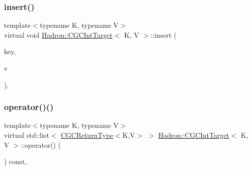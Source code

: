 \mbox{\label{classHadron_1_1CGCIntTarget_a2c1e2eaf068abdc394ba3326c7770e77}} 
\subsubsection{\texorpdfstring{insert()}{insert()}\hspace{0.1cm}{\footnotesize\ttfamily [2/2]}}
{\footnotesize\ttfamily template$<$typename K, typename V$>$ \\
virtual void \mbox{\hyperlink{classHadron_1_1CGCIntTarget}{Hadron\+::\+C\+G\+C\+Int\+Target}}$<$ K, V $>$\+::insert (\begin{DoxyParamCaption}\item[{const \mbox{\hyperlink{structHadron_1_1CGCKeyType}{C\+G\+C\+Key\+Type}}$<$ K $>$ \&}]{key,  }\item[{const V \&}]{v }\end{DoxyParamCaption})\hspace{0.3cm}{\ttfamily [inline]}, {\ttfamily [virtual]}}

\mbox{\label{classHadron_1_1CGCIntTarget_ae6c0ce90fe1f8a2880984df1e2e44c18}} 
\subsubsection{\texorpdfstring{operator()()}{operator()()}\hspace{0.1cm}{\footnotesize\ttfamily [1/4]}}
{\footnotesize\ttfamily template$<$typename K, typename V$>$ \\
virtual std\+::list$<$ \mbox{\hyperlink{structHadron_1_1CGCReturnType}{C\+G\+C\+Return\+Type}}$<$K,V$>$ $>$ \mbox{\hyperlink{classHadron_1_1CGCIntTarget}{Hadron\+::\+C\+G\+C\+Int\+Target}}$<$ K, V $>$\+::operator() (\begin{DoxyParamCaption}\item[{void}]{ }\end{DoxyParamCaption}) const\hspace{0.3cm}{\ttfamily [inline]}, {\ttfamily [virtual]}}



